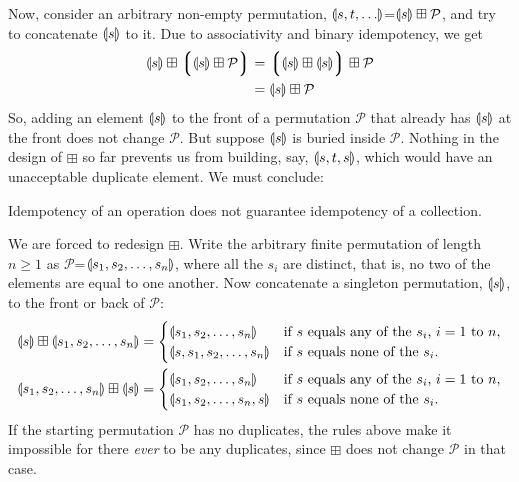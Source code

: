 Now, consider an arbitrary non-empty permutation, \mbox{$\llparenthesis s, t, \ldots\rrparenthesis$=$\llparenthesis s \rrparenthesis \boxplus \mathcal{P}$}, and try to concatenate $\llparenthesis s\rrparenthesis$ to it. Due to associativity and binary idempotency, we get
\begin{align*}
   \llparenthesis s\rrparenthesis \boxplus \left\lgroup \llparenthesis s \rrparenthesis   \boxplus \mathcal{P}\right\rgroup  &=
  \left\lgroup \llparenthesis s\rrparenthesis \boxplus  \llparenthesis s \rrparenthesis \right\rgroup \boxplus \mathcal{P} \\
  &= \llparenthesis s \rrparenthesis   \boxplus \mathcal{P}
\end{align*}
So, adding an element $\llparenthesis s\rrparenthesis$ to the front of a permutation $\mathcal{P}$ that already has $\llparenthesis s\rrparenthesis$ at the front does not change $\mathcal{P}$. But suppose $\llparenthesis s\rrparenthesis$ is buried inside $\mathcal{P}$. Nothing in the design of $\boxplus$ so far prevents us from building, say, $\llparenthesis s, t, s\rrparenthesis$, which would have an unacceptable duplicate element. We must conclude:
\begin{observation}
  Idempotency of an operation does not guarantee idempotency of a collection.
\end{observation}


We are forced to redesign $\boxplus$. Write the arbitrary finite permutation of length $n\ge 1$ as $\mathcal{P}$=$\llparenthesis s_1, s_2, \ldots, s_n\rrparenthesis$, where all the $s_i$ are distinct, that is, no two of the elements are equal to one another. Now concatenate a singleton permutation, $\llparenthesis s\rrparenthesis$, to the front or back of $\mathcal{P}$:
\begin{align}
  \llparenthesis s\rrparenthesis \boxplus  \llparenthesis s_1, s_2, \ldots, s_n\rrparenthesis &=
  \begin{cases}
    \llparenthesis s_1, s_2, \ldots, s_n\rrparenthesis &
      \text{if $s$ equals any of the $s_i$, $i=1$ to $n$},\\
    \llparenthesis s, s_1, s_2, \ldots, s_n\rrparenthesis &
      \text{if $s$ equals none of the $s_i$}.
  \end{cases}  \label{eqn:recursivelyidempotent1} \\
  \llparenthesis s_1, s_2, \ldots, s_n\rrparenthesis  \boxplus \llparenthesis s\rrparenthesis &=
  \begin{cases}
    \llparenthesis s_1, s_2, \ldots, s_n\rrparenthesis &
      \text{if $s$ equals any of the $s_i$, $i=1$ to $n$},\\
    \llparenthesis s_1, s_2, \ldots, s_n, s\rrparenthesis &
      \text{if $s$ equals none of the $s_i$}.
  \end{cases} \label{eqn:recursivelyidempotent2}
\end{align}
If the starting permutation $\mathcal{P}$ has no duplicates, the rules above make it impossible for there \emph{ever} to be any duplicates, since $\boxplus$ does not change $\mathcal{P}$ in that case.



